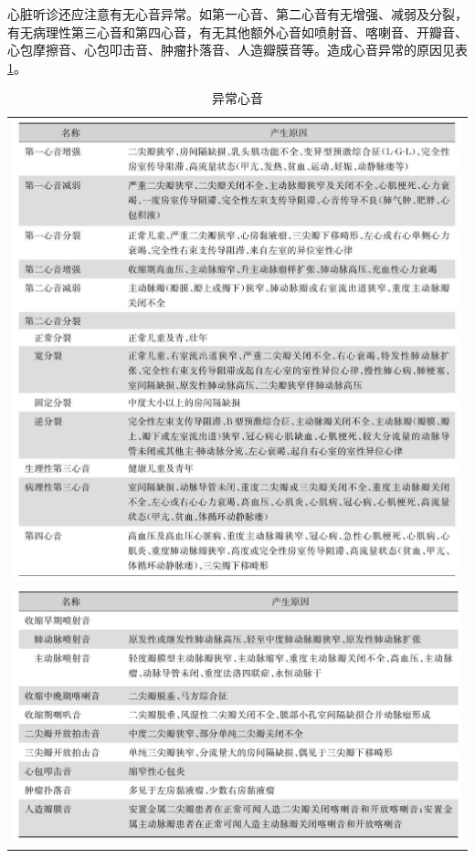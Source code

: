 心脏听诊还应注意有无心音异常。如第一心音、第二心音有无增强、减弱及分裂，有无病理性第三心音和第四心音，有无其他额外心音如喷射音、喀喇音、开瓣音、心包摩擦音、心包叩击音、肿瘤扑落音、人造瓣膜音等。造成心音异常的原因见表\ref{tab15-2}。

\begin{longtable}{c}
 \caption{异常心音}
 \label{tab15-2}
 \endfirsthead
 \caption[]{异常心音}
 \endhead
 \includegraphics[width=\textwidth,height=\textheight,keepaspectratio]{./images/Image00098.jpg}\\
 \includegraphics[width=\textwidth,height=\textheight,keepaspectratio]{./images/Image00099.jpg}
 \end{longtable}

